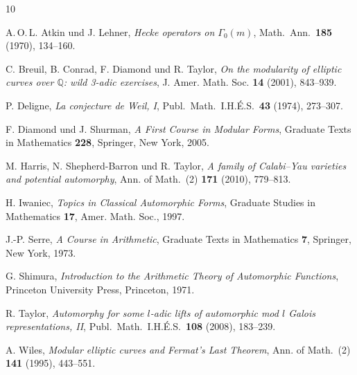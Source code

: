 \documentclass[12pt,a4paper]{amsart}
\theoremstyle{definition}
\begin{document}
\begin{thebibliography}{10}

  A.\,O.\,L. Atkin und J. Lehner,
  \emph{Hecke operators on $\Gamma_0(m)$},
  Math.\ Ann.\ \textbf{185} (1970), 134--160.

  C. Breuil, B. Conrad, F. Diamond und R. Taylor,
  \emph{On the modularity of elliptic curves over $\mathbb{Q}$: wild 3-adic exercises},
  J. Amer. Math. Soc. \textbf{14} (2001), 843--939.

  P. Deligne,
  \emph{La conjecture de Weil, I},
  Publ.\ Math.\ I.H.\'E.S.\ \textbf{43} (1974), 273--307.

  F. Diamond und J. Shurman,
  \emph{A First Course in Modular Forms},
  Graduate Texts in Mathematics \textbf{228}, Springer, New York, 2005.

  M. Harris, N. Shepherd-Barron und R. Taylor,
  \emph{A family of Calabi--Yau varieties and potential automorphy},
  Ann. of Math.\ (2) \textbf{171} (2010), 779--813.

  H. Iwaniec,
  \emph{Topics in Classical Automorphic Forms},
  Graduate Studies in Mathematics \textbf{17}, Amer. Math. Soc., 1997.

  J.-P. Serre,
  \emph{A Course in Arithmetic},
  Graduate Texts in Mathematics \textbf{7}, Springer, New York, 1973.

  G. Shimura,
  \emph{Introduction to the Arithmetic Theory of Automorphic Functions},
  Princeton University Press, Princeton, 1971.

  R. Taylor,
  \emph{Automorphy for some $l$-adic lifts of automorphic mod $l$ Galois representations, II},
  Publ.\ Math.\ I.H.\'E.S.\ \textbf{108} (2008), 183--239.

  A. Wiles,
  \emph{Modular elliptic curves and Fermat's Last Theorem},
  Ann. of Math.\ (2) \textbf{141} (1995), 443--551.

\end{thebibliography}
\end{document}
